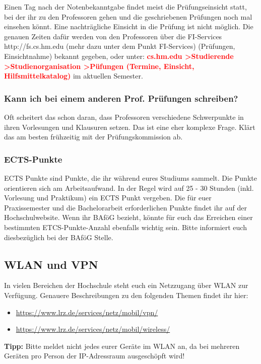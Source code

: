 Einen Tag nach der Notenbekanntgabe findet meist die Prüfungseinsicht statt, bei der ihr zu den Professoren gehen und die geschriebenen Prüfungen noch mal einsehen könnt. Eine nachträgliche Einsicht in die Prüfung ist nicht möglich. Die genauen Zeiten dafür werden von den Professoren über die FI-Services http://fs.cs.hm.edu (mehr dazu unter dem Punkt FI-Services) (Prüfungen, Einsichtnahme) bekannt gegeben, oder unter:\doublebreak
\textcolor{red}{\textbf{cs.hm.edu \textgreater Studierende \textgreater Studienorganisation \textgreater Püfungen (Termine, Einsicht, Hilfsmittelkatalog)}} im aktuellen Semester.

\subsubsection{Kann ich bei einem anderen Prof. Prüfungen schreiben?}

Oft scheitert das schon daran, dass Professoren verschiedene Schwerpunkte in ihren Vorlesungen und Klausuren setzen. Das ist eine eher komplexe Frage. Klärt das am besten frühzeitig mit der Prüfungskommission ab.

\subsubsection{ECTS-Punkte}

ECTS Punkte sind Punkte, die ihr während eures Studiums sammelt. Die Punkte orientieren sich am Arbeitsaufwand. In der Regel wird auf 25 - 30 Stunden (inkl. Vorlesung und Praktikum) ein ECTS Punkt vergeben. Die für euer Praxissemester und die Bachelorarbeit erforderlichen Punkte findet ihr auf der Hochschulwebsite.\doublebreak
Wenn ihr BAföG bezieht, könnte für euch das Erreichen einer bestimmten ETCS-Punkte-Anzahl ebenfalls wichtig sein. Bitte informiert euch diesbezüglich bei der BAföG Stelle.

\subsection{WLAN und VPN}

In vielen Bereichen der Hochschule steht euch ein Netzzugang über WLAN zur Verfügung. Genauere Beschreibungen zu den folgenden Themen findet ihr hier:

\begin{itemize}
	\item{\url{https://www.lrz.de/services/netz/mobil/vpn/}}
	\item{\url{https://www.lrz.de/services/netz/mobil/wireless/}}
\end{itemize}
\textbf{Tipp:} Bitte meldet nicht jedes eurer Geräte im WLAN an, da bei mehreren Geräten pro Person der IP-Adressraum ausgeschöpft wird!

